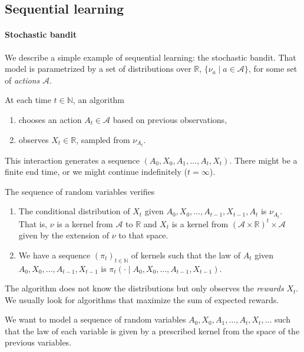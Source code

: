
\subsection{Sequential learning}
\label{sub:sequential_learning}

\paragraph{Stochastic bandit}

We describe a simple example of sequential learning: the stochastic bandit. That model is parametrized by a set of distributions over $\mathbb{R}$, $\{\nu_a \mid a \in \mathcal A\}$, for some set of \emph{actions} $\mathcal A$.

At each time $t \in \mathbb{N}$, an algorithm
\begin{enumerate}
	\item chooses an action $A_t \in \mathcal A$ based on previous observations,
	\item observes $X_t \in \mathbb{R}$, sampled from $\nu_{A_t}$.
\end{enumerate}

This interaction generates a sequence $(A_0, X_0, A_1, \ldots, A_t, X_t)$. There might be a finite end time, or we might continue indefinitely ($t = \infty$).

The sequence of random variables verifies \cite{lattimore2020bandit}
\begin{enumerate}
    \item The conditional distribution of $X_t$ given $A_0, X_0, \ldots, A_{t-1}, X_{t-1}, A_t$ is $\nu_{A_t}$. That is, $\nu$ is a kernel from $\mathcal A$ to $\mathbb{R}$ and $X_t$ is a kernel from $(\mathcal A \times \mathbb{R})^t \times \mathcal A$ given by the extension of $\nu$ to that space.
    \item We have a sequence $(\pi_t)_{t\in \mathbb{N}}$ of kernels such that the law of $A_t$ given $A_0, X_0, \ldots, A_{t-1}, X_{t-1}$ is $\pi_t(\cdot \mid A_0, X_0, \ldots, A_{t-1}, X_{t-1})$.
\end{enumerate}

The algorithm does not know the distributions but only observes the \emph{rewards} $X_t$. We usually look for algorithms that maximize the sum of expected rewards.

\begin{remark}
We want to model a sequence of random variables $A_0, X_0, A_1, \ldots, A_t, X_t, \ldots$ such that the law of each variable is given by a prescribed kernel from the space of the previous variables.
\end{remark}

